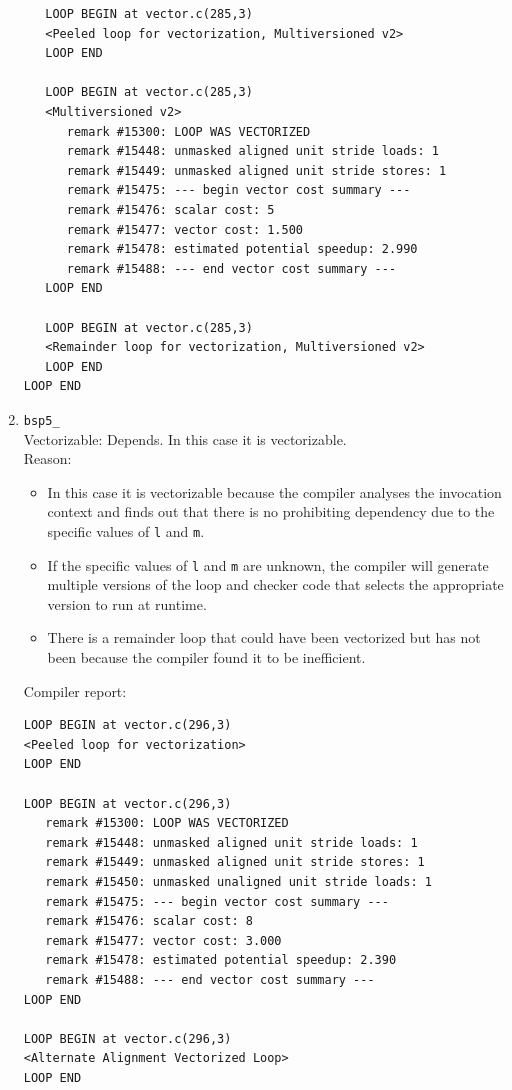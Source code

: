 \documentclass[11pt]{article}
\begin{document}
\begin{enumerate}
\begin{lstlisting}
   LOOP BEGIN at vector.c(285,3)
   <Peeled loop for vectorization, Multiversioned v2>
   LOOP END

   LOOP BEGIN at vector.c(285,3)
   <Multiversioned v2>
      remark #15300: LOOP WAS VECTORIZED
      remark #15448: unmasked aligned unit stride loads: 1 
      remark #15449: unmasked aligned unit stride stores: 1 
      remark #15475: --- begin vector cost summary ---
      remark #15476: scalar cost: 5 
      remark #15477: vector cost: 1.500 
      remark #15478: estimated potential speedup: 2.990 
      remark #15488: --- end vector cost summary ---
   LOOP END

   LOOP BEGIN at vector.c(285,3)
   <Remainder loop for vectorization, Multiversioned v2>
   LOOP END
LOOP END
\end{lstlisting}

\item \texttt{bsp5\_}\\
Vectorizable: Depends. In this case it is vectorizable.\\
Reason:
\begin{itemize}
\item In this case it is vectorizable because the compiler analyses the invocation context and finds out that there is no prohibiting dependency due to the specific values of \texttt{l} and \texttt{m}.
\item If the specific values of \texttt{l} and \texttt{m} are unknown, the compiler will generate multiple versions of the loop and checker code that selects the appropriate version to run at runtime.
\item There is a remainder loop that could have been vectorized but has not been because the compiler found it to be inefficient.
\end{itemize}
Compiler report:
\begin{lstlisting}
LOOP BEGIN at vector.c(296,3)
<Peeled loop for vectorization>
LOOP END

LOOP BEGIN at vector.c(296,3)
   remark #15300: LOOP WAS VECTORIZED
   remark #15448: unmasked aligned unit stride loads: 1 
   remark #15449: unmasked aligned unit stride stores: 1 
   remark #15450: unmasked unaligned unit stride loads: 1 
   remark #15475: --- begin vector cost summary ---
   remark #15476: scalar cost: 8 
   remark #15477: vector cost: 3.000 
   remark #15478: estimated potential speedup: 2.390 
   remark #15488: --- end vector cost summary ---
LOOP END

LOOP BEGIN at vector.c(296,3)
<Alternate Alignment Vectorized Loop>
LOOP END


\end{lstlisting}
\end{enumerate}
\end{document}
